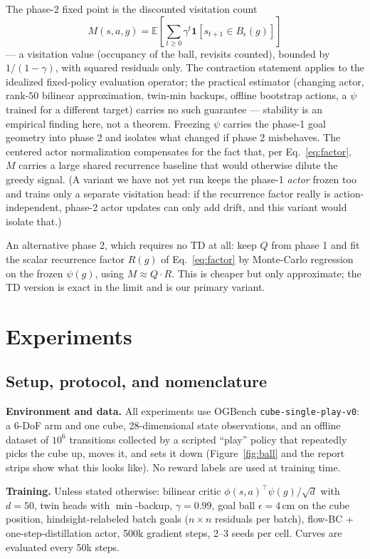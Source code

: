 \documentclass[10pt]{article}
\newcommand{\E}{\mathbb{E}}
\newcommand{\ind}[1]{\mathbf{1}\!\left[#1\right]}
\begin{document}
The phase-2 fixed point is the discounted visitation count
\[
M(s,a,g)=\E\left[\sum_{t\ge0}\gamma^{t}\ind{s_{t+1}\in B_\epsilon(g)}\right]
\]
--- a visitation value (occupancy of the ball, revisits counted), bounded by
$1/(1-\gamma)$, with squared residuals only.
The contraction statement applies to the idealized fixed-policy evaluation operator; the
practical estimator (changing actor, rank-$50$ bilinear approximation, twin-min backups,
offline bootstrap actions, a $\psi$ trained for a different target) carries no such
guarantee --- stability is an empirical finding here, not a theorem.
Freezing $\psi$ carries the phase-1 goal geometry into phase 2 and isolates what changed if phase 2 misbehaves.
The centered actor normalization compensates for the fact that, per Eq.~\ref{eq:factor}, $M$ carries a large shared recurrence baseline that would otherwise dilute the greedy signal.
(A variant we have not yet run keeps the phase-1 \emph{actor} frozen too and trains only a
separate visitation head: if the recurrence factor really is action-independent, phase-2
actor updates can only add drift, and this variant would isolate that.)

An alternative phase 2, which requires no TD at all: keep $Q$ from phase 1 and fit the scalar recurrence factor $R(g)$ of Eq.~\ref{eq:factor} by Monte-Carlo regression on the frozen $\psi(g)$, using $M\approx Q\cdot R$.
This is cheaper but only approximate; the TD version is exact in the limit and is our primary variant.

\section{Experiments}
\label{sec:experiments}

\subsection{Setup, protocol, and nomenclature}

\textbf{Environment and data.} All experiments use OGBench
\texttt{cube-single-play-v0}: a 6-DoF arm and one cube, 28-dimensional state
observations, and an offline dataset of $10^{6}$ transitions collected by a scripted
``play'' policy that repeatedly picks the cube up, moves it, and sets it down
(Figure~\ref{fig:ball} and the report strips show what this looks like).
No reward labels are used at training time.

\textbf{Training.} Unless stated otherwise: bilinear critic
$\phi(s,a)^{\top}\psi(g)/\sqrt d$ with $d{=}50$, twin heads with $\min$-backup,
$\gamma=0.99$, goal ball $\epsilon=4$\,cm on the cube position, hindsight-relabeled
batch goals ($n\times n$ residuals per batch), flow-BC + one-step-distillation actor,
500k gradient steps, 2--3 seeds per cell.
Curves are evaluated every 50k steps.
\end{document}
